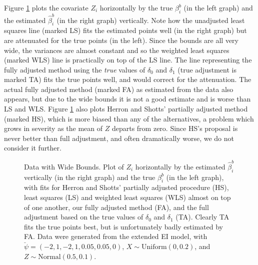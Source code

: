 \documentclass[11pt,titlepage]{article}
\begin{document}
Figure \ref{f:wide} plots the covariate $Z_i$ horizontally by the true
$\beta_i^b$ (in the left graph) and the estimated $\hat\beta_i^b$ (in
the right graph) vertically.  Note how the unadjusted least squares
line (marked LS) fits the estimated points well (in the right graph)
but are attenuated for the true points (in the left).  Since the
bounds are all very wide, the variances are almost constant and so the
weighted least squares (marked WLS) line is practically on top of the
LS line.  The line representing the fully adjusted method using the
\emph{true} values of $\delta_0$ and $\delta_1$ (true adjustment is
marked TA) fits the true points well, and would correct for the
attenuation.  The actual fully adjusted method (marked FA) as
estimated from the data also appears, but due to the wide bounds it is
not a good estimate and is worse than LS and WLS.  Figure \ref{f:wide}
also plots Herron and Shotts' partially adjusted method (marked HS),
which is more biased than any of the alternatives, a problem which
grows in severity as the mean of $Z$ departs from zero.  Since HS's
proposal is never better than full adjustment, and often dramatically
worse, we do not consider it further.
\begin{figure}[t]
  \begin{center}
    \caption{Data with Wide Bounds. Plot of $Z_i$ horizontally by
      the estimated $\hat\beta_i^b$ vertically (in the right graph)
      and the true $\beta_i^b$ (in the left graph), with fits for
      Herron and Shotts' partially adjusted procedure (HS), least
      squares (LS) and weighted least squares (WLS) almost on top of
      one another, our fully adjusted method (FA), and the full
      adjustment based on the true values of $\delta_0$ and $\delta_1$
      (TA).  Clearly TA fits the true points best, but is
      unfortunately badly estimated by FA.  Data were generated from
      the extended EI model, with
      $\breve\psi=(-2,1,-2,1,0.05,0.05,0)$, $X \sim
      \textrm{Uniform}(0,0.2)$, and $Z \sim
      \textrm{Normal}(0.5,0.1)$.}
    \label{f:wide}
  \end{center}
\end{figure}
\end{document}
